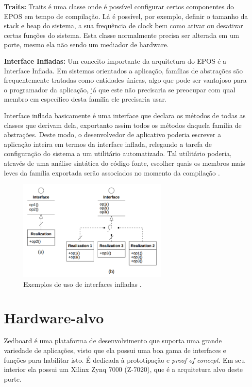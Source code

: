 \textbf{Traits:} Traits é uma classe onde é possível configurar certos componentes do EPOS em tempo de compilação. Lá é possível, por exemplo, definir o tamanho da stack e heap do sistema, a sua frequência de clock bem como ativar ou desativar certas funções do sistema. Esta classe normalmente precisa ser alterada em um porte, mesmo ela não sendo um mediador de hardware.

\textbf{Interface Infladas: } Um conceito importante da arquitetura do EPOS é a Interface Inflada. %
Em sistemas orientados a aplicação, famílias de abstrações são frequentemente tratadas como entidades únicas, algo que pode ser vantajoso para o programador da aplicação, já que este não precisaria se preocupar com qual membro em específico desta família ele precisaria usar\cite{guto_thesis}.

Interface inflada basicamente é uma interface que declara os métodos de todas as classes que derivam dela, exportanto assim todos os métodos daquela família de abstrações. Deste modo, o desenvolvedor de aplicativo poderia escrever a aplicação inteira em termos da interface inflada, relegando a tarefa de configuração do sistema a um utilitário automatizado. Tal utilitário poderia, através de uma análise sintática do código fonte, escolher quais os membros mais leves da família exportada serão associados no momento da compilação \cite[p.~56]{guto_thesis}.

\begin{figure}[ht!]
    \centering
    \includegraphics[width=7.5cm]{figuras/inflated_interface}
    \caption{Exemplos de uso de interfaces infladas \cite{guto_thesis}.}
\end{figure}


\section{Hardware-alvo}
Zedboard é uma plataforma de desenvolvimento que suporta uma grande variedade de aplicações, visto que ela possui uma boa gama de interfaces e funções para habilitar isto. É dedicada à prototipação e \emph{proof-of-concept}. Em seu interior ela possui um Xilinx Zynq 7000 (Z-7020), que é a arquitetura alvo deste porte.

